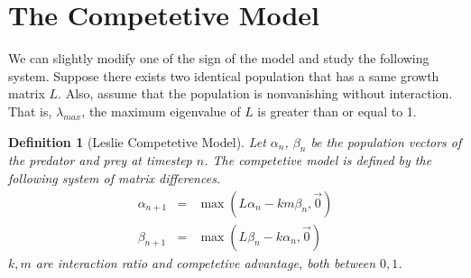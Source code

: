 \documentclass{article}
\newtheorem{remark}{Remark}[section]
\newtheorem{definition}{Definition}[section]
\newtheorem{remark}{Remark}
\newtheorem{definition}{Definition}
\numberwithin{equation}{section}
\begin{document}

\section{The Competetive Model}
We can slightly modify one of the sign of the model and 
study the following system. Suppose there exists two identical 
population that has a same growth matrix $L$. Also, assume 
that the population is nonvanishing without interaction. That is, 
$\lambda_{max}$, the maximum eigenvalue of $L$ is greater 
than or equal to 1. 
\begin{definition}[Leslie Competetive Model]
Let $\alpha_n$, $\beta_n$ be the population vectors 
of the predator and prey at timestep $n$. The competetive 
model is defined by the following 
system of matrix differences. 
\begin{eqnarray}\label{eqn:conditions}
    \alpha_{n + 1} &=& \max(L \alpha_n - k m \beta_n, \vec 0) \\ 
    \beta_{n + 1} &=& \max(L \beta_n - k \alpha_n, \vec 0) \nonumber
\end{eqnarray}
$k, m$ are interaction ratio and competetive advantage, both between $0, 1$. 
\end{definition}
\end{document}
